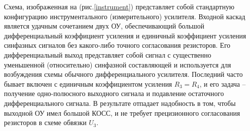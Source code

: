 Схема, изображенная на (рис.\ref{instrument}) представляет собой стандартную конфигурацию инструментального (измерительного) усилителя.
Входной каскад является удачным сочетанием двух ОУ, обеспечивающий большой дифференциальный коэффициент усиления и
единичный коэффициент усиления синфазных сигналов без какого-либо точного согласования резисторов.
Его дифференциальный выход представляет собой сигнал с существенно уменьшенной (относительно) синфазной составляющей 
и используется для возбуждения схемы обычного дифференциального усилителя. Последний часто бывает включен
с единичным коэффициентом усиления $R_3 = R_4$, и его задача -- получение одно-полюсного выходного сигнала
и подавление остаточного дифференциального сигнала. В результате отпадает надобность в том, 
чтобы выходной ОУ имел большой КОСС, и не требует прецизионного согласования резисторов в схеме обвязки $U_3$.
